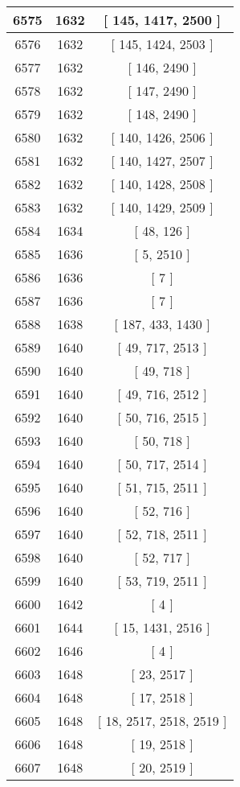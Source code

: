 \begin{center}
\begin{longtable}[H]{|| c c c ||}
\hline
6575 & 1632 & [ 145, 1417, 2500 ] \\ 
\hline
6576 & 1632 & [ 145, 1424, 2503 ] \\ 
\hline
6577 & 1632 & [ 146, 2490 ] \\ 
\hline
6578 & 1632 & [ 147, 2490 ] \\ 
\hline
6579 & 1632 & [ 148, 2490 ] \\ 
\hline
6580 & 1632 & [ 140, 1426, 2506 ] \\ 
\hline
6581 & 1632 & [ 140, 1427, 2507 ] \\ 
\hline
6582 & 1632 & [ 140, 1428, 2508 ] \\ 
\hline
6583 & 1632 & [ 140, 1429, 2509 ] \\ 
\hline
6584 & 1634 & [ 48, 126 ] \\ 
\hline
6585 & 1636 & [ 5, 2510 ] \\ 
\hline
6586 & 1636 & [ 7 ] \\ 
\hline
6587 & 1636 & [ 7 ] \\ 
\hline
6588 & 1638 & [ 187, 433, 1430 ] \\ 
\hline
6589 & 1640 & [ 49, 717, 2513 ] \\ 
\hline
6590 & 1640 & [ 49, 718 ] \\ 
\hline
6591 & 1640 & [ 49, 716, 2512 ] \\ 
\hline
6592 & 1640 & [ 50, 716, 2515 ] \\ 
\hline
6593 & 1640 & [ 50, 718 ] \\ 
\hline
6594 & 1640 & [ 50, 717, 2514 ] \\ 
\hline
6595 & 1640 & [ 51, 715, 2511 ] \\ 
\hline
6596 & 1640 & [ 52, 716 ] \\ 
\hline
6597 & 1640 & [ 52, 718, 2511 ] \\ 
\hline
6598 & 1640 & [ 52, 717 ] \\ 
\hline
6599 & 1640 & [ 53, 719, 2511 ] \\ 
\hline
6600 & 1642 & [ 4 ] \\ 
\hline
6601 & 1644 & [ 15, 1431, 2516 ] \\ 
\hline
6602 & 1646 & [ 4 ] \\ 
\hline
6603 & 1648 & [ 23, 2517 ] \\ 
\hline
6604 & 1648 & [ 17, 2518 ] \\ 
\hline
6605 & 1648 & [ 18, 2517, 2518, 2519 ] \\ 
\hline
6606 & 1648 & [ 19, 2518 ] \\ 
\hline
6607 & 1648 & [ 20, 2519 ] \\ 

\end{longtable}
\end{center}

